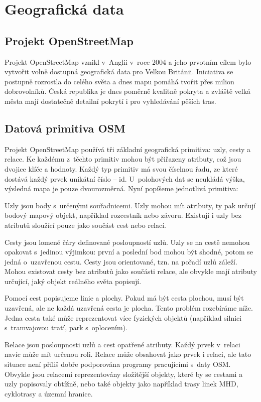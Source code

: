 \chapter{Geografická data}
\section{Projekt OpenStreetMap}
Projekt OpenStreetMap \cite{osmweb} vznikl v~Anglii v~roce 2004 a jeho prvotním cílem bylo
vytvořit volně dostupná geografická data pro Velkou Británii. Iniciativa se
postupně rozrostla do celého světa a dnes mapu pomáhá tvořit přes milion
dobrovolníků. Česká republika je dnes poměrně kvalitně pokryta a zvláště velká
města mají dostatečně detailní pokrytí i pro vyhledávání pěších tras.

\section{Datová primitiva OSM} 
Projekt OpenStreetMap používá tři základní geografická primitiva: uzly, cesty a
relace. Ke každému z~těchto primitiv mohou být přiřazeny atributy, což jsou
dvojice klíče a hodnoty. Každý typ primitiv má svou číselnou řadu, ze které
dostává každý prvek unikátní číslo -- id. 
U~polohových dat se neukládá výška, výsledná mapa je pouze dvourozměrná.
Nyní popíšeme jednotlivá primitiva:

{\tuc Uzly} jsou body s~určenými souřadnicemi. Uzly mohou mít atributy, ty pak
určují bodový mapový objekt, například rozcestník nebo závoru. Existují i uzly
bez atributů sloužící pouze jako součást cest nebo relací.

{\tuc Cesty} jsou lomené čáry definované posloupností uzlů. Uzly se na cestě nemohou opakovat
s~jedinou výjimkou: první a poslední bod mohou být shodné, potom se jedná
o~uzavřenou cestu. Cesty jsou orientované, tzn. na pořadí uzlů záleží. Mohou
existovat cesty bez atributů jako součásti relace, ale obvykle mají atributy
určující, jaký objekt reálného světa popisují.

Pomocí cest popisujeme linie a plochy. Pokud má být cesta plochou, musí být
uzavřená, ale ne každá uzavřená cesta je plocha. Tento problém rozebíráme níže.
Jedna cesta také může reprezentovat více fyzických objektů (například silnici
s~tramvajovou tratí, park s~oplocením).

{\tuc Relace} jsou posloupnosti uzlů a cest opatřené atributy. Každý prvek
v~relaci navíc může mít určenou roli. Relace může obsahovat jako prvek i relaci,
ale tato situace není příliš dobře podporována programy pracujícími s~daty OSM. 
Obvykle jsou relacemi reprezentovány složitější objekty, které by se cestami a
uzly popisovaly obtížně, nebo také  objekty jako například
trasy linek MHD, cyklotrasy a územní hranice.

